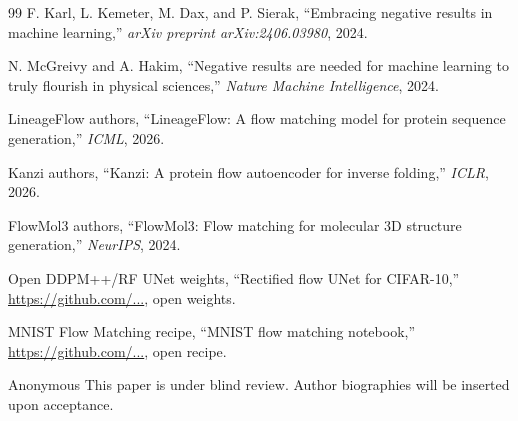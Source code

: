 \documentclass[journal,twocolumn,final]{IEEEtran}
\begin{document}
\begin{thebibliography}{99}
F. Karl, L. Kemeter, M. Dax, and P. Sierak, ``Embracing negative results in
machine learning,'' \emph{arXiv preprint arXiv:2406.03980}, 2024.

N. McGreivy and A. Hakim, ``Negative results are needed for machine learning
to truly flourish in physical sciences,'' \emph{Nature Machine Intelligence},
2024.

LineageFlow authors, ``LineageFlow: A flow matching model for protein
sequence generation,'' \emph{ICML}, 2026.

Kanzi authors, ``Kanzi: A protein flow autoencoder for inverse folding,''
\emph{ICLR}, 2026.

FlowMol3 authors, ``FlowMol3: Flow matching for molecular 3D structure
generation,'' \emph{NeurIPS}, 2024.

Open DDPM++/RF UNet weights, ``Rectified flow UNet for CIFAR-10,''
\url{https://github.com/...}, open weights.

MNIST Flow Matching recipe, ``MNIST flow matching notebook,''
\url{https://github.com/...}, open recipe.

\end{thebibliography}

\begin{IEEEbiographynophoto}{Anonymous}
This paper is under blind review. Author biographies will be inserted upon
acceptance.
\end{IEEEbiographynophoto}
\end{document}
